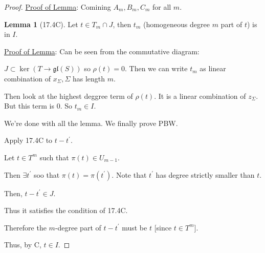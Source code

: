 \documentclass{article}
\theoremstyle{definition}
\newtheorem{lemma}[theorem]{Lemma}
\begin{document}
\begin{proof}
        \underline{Proof of Lemma}: Comining \(A_m, B_m, C_m\) for all \(m\).

        \begin{lemma}
            [17.4C]

            Let \(t \in T_m \cap J\), then \(t_m\) (homogeneous degree \(m\) part of \(t\)) is in \(I\).
        \end{lemma}

        \underline{Proof of Lemma}: Can be seen from the commutative diagram:
        
        \begin{center}
        \end{center}

        \(J \subset \ker (T \to \mathfrak{gl}(S))\) so \(\rho(t) = 0\). Then we can write \(t_m\) as linear combination of \(x_\Sigma, \Sigma\) has length \(m\).
        
        Then look at the highest deggree term of \(\rho(t)\). It is a linear combination of \(z_\Sigma\). But this term is \(0\). So \(t_m \in I\).

        We're done with all the lemma. We finally prove PBW.

        Apply 17.4C to \(t - t^{\prime}\). 
        
        Let \(t \in T^m\) such that \(\pi (t) \in U_{m-1}\).

        Then \(\exists t^{\prime}\) soo that \(\pi(t) = \pi(t^{\prime})\). Note that \(t^{\prime}\) has degree strictly smaller than \(t\).
        
        Then, \(t-t^{\prime} \in J\).

        Thus it satisfies the condition of 17.4C.

        Therefore the \(m\)-degree part of \(t - t^{\prime}\) must be \(t\) [since \(t\in T^m\)].

        Thus, by C, \(t\in I\).

    \end{proof}
\end{document}
